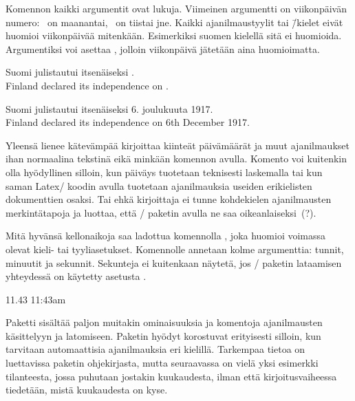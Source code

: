 \noindent
Komennon kaikki argumentit ovat lukuja. Viimeinen argumentti on
viikonpäivän numero: ~on maanantai, ~on tiistai jne.
Kaikki ajanilmaustyylit tai \=/kielet eivät huomioi viikonpäivää
mitenkään. Esimerkiksi suomen kielellä sitä ei huomioida. Argumentiksi
voi asettaa , jolloin viikonpäivä jätetään aina huomioimatta.

\begin{koodilohkosis}
 Suomi julistautui itsenäiseksi
. \\
 Finland declared its independence on
.
\end{koodilohkosis}

\begin{tulossis}
  Suomi julistautui itsenäiseksi 6. joulukuuta 1917. \\
  Finland declared its independence on 6th December 1917.
\end{tulossis}

\noindent
Yleensä lienee kätevämpää kirjoittaa kiinteät päivämäärät ja muut
ajanilmaukset ihan normaalina tekstinä eikä minkään komennon avulla.
Komento  voi kuitenkin olla hyödyllinen silloin,
kun päiväys tuotetaan teknisesti laskemalla tai kun saman Latex\-/
koodin avulla tuotetaan ajanilmauksia useiden erikielisten dokumenttien
osaksi. Tai ehkä kirjoittaja ei tunne kohdekielen ajanilmausten
merkintätapoja ja luottaa, että \-/ paketin avulla ne
saa oikeanlaiseksi~(?).

Mitä hyvänsä kellonaikoja saa ladottua komennolla
, joka huomioi voimassa olevat kieli- tai
tyyliasetukset. Komennolle annetaan kolme argumenttia: tunnit, minuutit
ja sekunnit. Sekunteja ei kuitenkaan näytetä, jos \-/
paketin lataamisen yhteydessä on käytetty asetusta
.

\begin{koodilohkosis}
 
   
\end{koodilohkosis}

\begin{tulossis}
   11.43 11:43am
\end{tulossis}

\noindent
Paketti  sisältää paljon muitakin ominaisuuksia ja
komentoja ajanilmausten käsittelyyn ja latomiseen. Paketin hyödyt
korostuvat erityisesti silloin, kun tarvitaan automaattisia
ajanilmauksia eri kielillä. Tarkempaa tietoa on luettavissa paketin
ohjekirjasta, mutta seuraavassa on vielä yksi esimerkki tilanteesta,
jossa puhutaan jostakin kuukaudesta, ilman että kirjoitusvaiheessa
tiedetään, mistä kuukaudesta on kyse.

